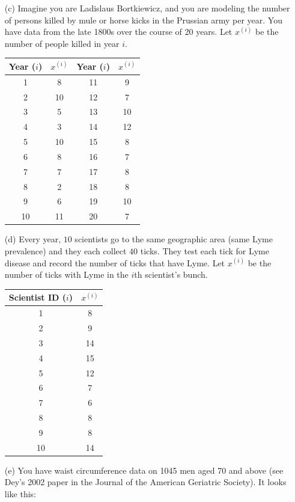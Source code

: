 \begin{question}{}
\begin{enumerate}
    \item[(c)] Imagine you are Ladislaus Bortkiewicz, and you are modeling the number of persons killed by mule or horse kicks in the Prussian army per year. You have data from the late 1800s over the course of 20 years. Let $x^{(i)}$ be the number of people killed in year $i$.
        
\begin{center}{\small
\begin{tabular}{cc|cc}
\toprule
Year ($i$) & $x^{(i)}$ & Year ($i$) & $x^{(i)}$ \\
\midrule
1 & 8 & 11 & 9 \\
2 & 10 & 12 & 7 \\
3 & 5 & 13 & 10 \\
4 & 3 & 14 & 12 \\
5 & 10 & 15 & 8 \\
6 & 8 & 16 & 7 \\
7 & 7 & 17 & 8 \\
8 & 2 & 18 & 8 \\
9 & 6 & 19 & 10 \\
10 & 11 & 20 & 7 \\
\end{tabular}}
\end{center}
    
    \item[(d)] Every year, $10$ scientists go to the same geographic area (same Lyme prevalence) and they each collect $40$ ticks. They test each tick for Lyme disease and record the number of ticks that have Lyme. Let $x^{(i)}$ be the number of ticks with Lyme in the $i$th scientist's bunch.
        
\begin{center}{\small
\begin{tabular}{cc}
\toprule
Scientist ID ($i$) & $x^{(i)}$ \\
\midrule
1 & 8 \\
2 & 9 \\
3 & 14 \\
4 & 15 \\
5 & 12 \\
6 & 7 \\
7 & 6 \\
8 & 8 \\
9 & 8 \\
10 & 14 \\
\end{tabular}}
\end{center}
    
    \item[(e)] You have waist circumference data on 1045 men aged 70 and above (see Dey's 2002 paper in the Journal of the American Geriatric Society). It looks like this:
    

\end{enumerate}
\end{question}
